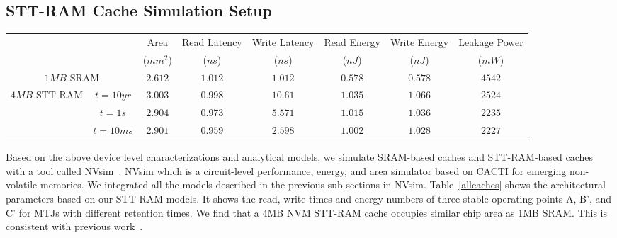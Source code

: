 
\subsection{STT-RAM Cache Simulation Setup}

\begin{figure*} [t]
\centering
\centering
 \caption{\label{fig:currentVStime} Write current versus write pulse width for three MTJs with 10yr-, 1s, and 10ms- retention at 125 celsius degree}
\end{figure*}

\begin{table*}[t]
 \scriptsize
  \centering
  \caption{16-way L2 Cache Simulation Results}
  \label{allcaches}
  \begin{tabular}{| c | c | c | c | c | c | c | c |}
    \hline\hline
    \multirow{2}{*}{} & & Area  & Read Latency & Write Latency & Read Energy & Write Energy & Leakage Power\\
  & & ($mm^2$) & ($ns$) & ($ns$) & ($nJ$) & ($nJ$) & ($mW$) \\
    \hline\hline
    \multicolumn{2}{|c|}{$1MB$ SRAM} & $2.612$ & $1.012$ & $1.012$ & $0.578$ & $0.578$ & $4542$ \\
    \hline
    \multirow{3}{*}{$4MB$ STT-RAM} & $t=10yr$ & $3.003$ & $0.998$ & $10.61$ & $1.035$ & $1.066$ & $2524$ \\
    & {$t=1s$} & $2.904$ & $0.973$ & $5.571$ & $1.015$ & $1.036$ & $2235$ \\
    & {$t=10ms$} & $2.901$ & $0.959$ & $2.598$ & $1.002$ & $1.028$ & $2227$ \\
    \hline\hline
  \end{tabular}
\end{table*}

Based on the above device level characterizations and analytical models, we simulate SRAM-based
caches and STT-RAM-based caches with a tool called NVsim~\cite{CACTI:PCRAMsim}. NVsim which is a
circuit-level performance, energy, and area simulator based on CACTI for emerging non-volatile
memories. We integrated all the models described in the previous sub-sections in NVsim.
Table~\ref{allcaches} shows the architectural parameters based on our STT-RAM models. It shows the
read, write times and energy numbers of three stable operating points A, B', and C' for MTJs with different retention times. We find that a 4MB NVM STT-RAM cache occupies similar chip area as 1MB SRAM. This is consistent with previous work~\cite{CACTI:DAC08:Dong}.

